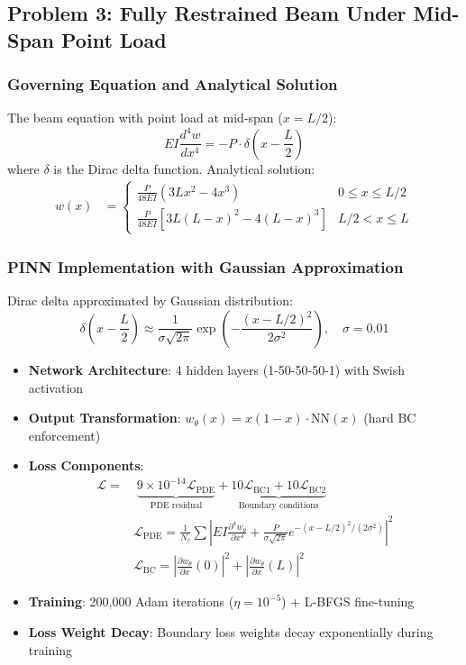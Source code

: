 \documentclass[12pt]{article}
\begin{document}
\subsection{Problem 3: Fully Restrained Beam Under Mid-Span Point Load}
\subsubsection{Governing Equation and Analytical Solution}
The beam equation with point load at mid-span ($x = L/2$):
\begin{equation}
EI \frac{d^4 w}{dx^4} = -P \cdot \delta\left(x - \frac{L}{2}\right)
\end{equation}
where $\delta$ is the Dirac delta function. Analytical solution:
\begin{align*}
w(x) &= 
\begin{cases} 
\frac{P}{48EI}(3Lx^2 - 4x^3) & 0 \leq x \leq L/2 \\
\frac{P}{48EI}[3L(L-x)^2 - 4(L-x)^3] & L/2 < x \leq L 
\end{cases}
\end{align*}

\subsubsection{PINN Implementation with Gaussian Approximation}
Dirac delta approximated by Gaussian distribution:
\begin{equation}
\delta\left(x - \frac{L}{2}\right) \approx \frac{1}{\sigma\sqrt{2\pi}} \exp\left(-\frac{(x - L/2)^2}{2\sigma^2}\right), \quad \sigma=0.01
\end{equation}

\begin{itemize}
\item \textbf{Network Architecture}: 4 hidden layers (1-50-50-50-1) with Swish activation
\item \textbf{Output Transformation}: $w_{\theta}(x) = x(1-x) \cdot \text{NN}(x)$ (hard BC enforcement)
\item \textbf{Loss Components}:
\begin{align*}
\mathcal{L} = &\; \underbrace{9 \times 10^{-14} \mathcal{L}_{\text{PDE}}}_{\text{PDE residual}} + \underbrace{10 \mathcal{L}_{\text{BC1}} + 10 \mathcal{L}_{\text{BC2}}}_{\text{Boundary conditions}} \\
& \mathcal{L}_{\text{PDE}} = \frac{1}{N_c} \sum \left|EI \frac{\partial^4 w_\theta}{\partial x^4} + \frac{P}{\sigma\sqrt{2\pi}} e^{-(x-L/2)^2/(2\sigma^2)}\right|^2 \\
& \mathcal{L}_{\text{BC}} = \left|\frac{\partial w_\theta}{\partial x}(0)\right|^2 + \left|\frac{\partial w_\theta}{\partial x}(L)\right|^2
\end{align*}
\item \textbf{Training}: 200,000 Adam iterations ($\eta=10^{-5}$) + L-BFGS fine-tuning
\item \textbf{Loss Weight Decay}: Boundary loss weights decay exponentially during training
\end{itemize}
\end{document}
